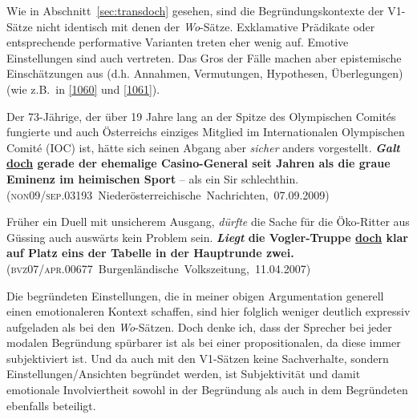 Wie in Abschnitt~\ref{sec:transdoch} gesehen, sind die Begründungskontexte der V1-Sätze nicht identisch mit denen der \textit{Wo}-Sätze. Exklamative Prädikate oder entsprechende performative Varianten treten eher wenig auf. Emotive Einstellungen sind auch vertreten. Das Gros der Fälle machen aber epistemische Einschätzungen aus (d.h. Annahmen, Vermutungen, Hypothesen, Überlegungen) (wie z.B.\ in \ref{1060} und  \ref{1061}).

\begin{exe}
	\ex\label{1060} 

	Der 73-Jährige, der über 19 Jahre lang an der Spitze des Olympischen Comités fungierte und auch Österreichs einziges Mitglied im Internationalen 			Olympischen Comité (IOC) ist, hätte sich seinen Abgang aber \emph{sicher} anders vorgestellt. \textbf{\textit{Galt} \ul{doch} gerade der 			ehemalige Casino-General seit Jahren als die graue Eminenz im heimischen Sport} – als ein Sir schlechthin. 
	\hfill\hbox{(\textsc{non09/sep.03193} Niederösterreichische Nachrichten, 07.09.2009)}
\end{exe}
				 
\begin{exe}
	\ex\label{1061} 

	Früher ein Duell mit unsicherem Ausgang, \emph{dürfte} die Sache für die Öko-Ritter aus Güssing auch auswärts kein Problem sein. \textbf{\textit{Liegt} 	die Vogler-Truppe \ul{doch} klar auf Platz eins der Tabelle in der Hauptrunde zwei.}
	\newline\hbox{}\hfill\hbox{(\textsc{bvz07/apr.00677} Burgenländische Volkszeitung, 11.04.2007)}
\end{exe}	
Die begründeten Einstellungen, die in meiner obigen Argumentation generell einen emotionaleren Kontext schaffen, sind hier folglich weniger deutlich expressiv aufgeladen als bei den \textit{Wo}-Sätzen. Doch denke ich, dass der Sprecher bei jeder modalen Begründung  spürbarer ist als bei einer propositionalen, da diese immer subjektiviert  ist. Und da auch mit den V1-Sätzen keine Sachverhalte, sondern Einstellungen/Ansichten begründet werden, ist Subjektivität und damit emotionale Involviertheit sowohl in der Begründung als auch in dem Begründeten ebenfalls beteiligt.

